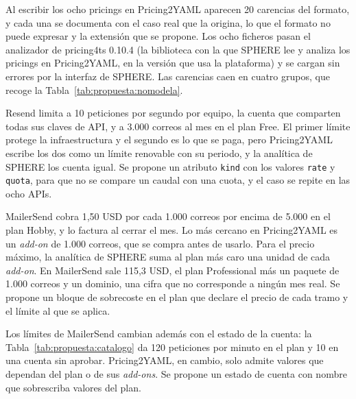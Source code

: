 Al escribir los ocho pricings en Pricing2YAML aparecen 20 carencias del formato, y cada una se documenta con el caso real que la origina, lo que el formato no puede expresar y la extensión que se propone.
Los ocho ficheros pasan el analizador de pricing4ts 0.10.4 (la biblioteca con la que SPHERE lee y analiza los pricings en Pricing2YAML, en la versión que usa la plataforma) y se cargan sin errores por la interfaz de SPHERE.
Las carencias caen en cuatro grupos, que recoge la Tabla~\ref{tab:propuesta:nomodela}.

Resend limita a 10 peticiones por segundo por equipo, la cuenta que comparten todas sus claves de API, y a 3.000 correos al mes en el plan Free.
El primer límite protege la infraestructura y el segundo es lo que se paga, pero Pricing2YAML escribe los dos como un límite renovable con su periodo, y la analítica de SPHERE los cuenta igual.
Se propone un atributo \texttt{kind} con los valores \texttt{rate} y \texttt{quota}, para que no se compare un caudal con una cuota, y el caso se repite en las ocho APIs.

MailerSend cobra 1,50 USD por cada 1.000 correos por encima de 5.000 en el plan Hobby, y lo factura al cerrar el mes.
Lo más cercano en Pricing2YAML es un \textit{add-on} de 1.000 correos, que se compra antes de usarlo.
Para el precio máximo, la analítica de SPHERE suma al plan más caro una unidad de cada \textit{add-on}.
En MailerSend sale 115,3 USD, el plan Professional más un paquete de 1.000 correos y un dominio, una cifra que no corresponde a ningún mes real.
Se propone un bloque de sobrecoste en el plan que declare el precio de cada tramo y el límite al que se aplica.

Los límites de MailerSend cambian además con el estado de la cuenta: la Tabla~\ref{tab:propuesta:catalogo} da 120 peticiones por minuto en el plan y 10 en una cuenta sin aprobar.
Pricing2YAML, en cambio, solo admite valores que dependan del plan o de sus \textit{add-ons}.
Se propone un estado de cuenta con nombre que sobrescriba valores del plan.

